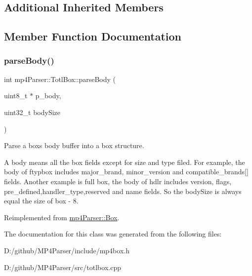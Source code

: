 \subsection*{Additional Inherited Members}


\subsection{Member Function Documentation}
\mbox{\label{classmp4_parser_1_1_totl_box_a352271d47a04f7884e81978ce4e8d697}} 
\subsubsection{\texorpdfstring{parseBody()}{parseBody()}}
{\footnotesize\ttfamily int mp4\+Parser\+::\+Totl\+Box\+::parse\+Body (\begin{DoxyParamCaption}\item[{uint8\+\_\+t $\ast$}]{p\+\_\+body,  }\item[{uint32\+\_\+t}]{body\+Size }\end{DoxyParamCaption})\hspace{0.3cm}{\ttfamily [virtual]}}



Parse a box\textquotesingle{}s body buffer into a box structure. 

A body means all the box fields except for size and type filed. For example, the body of ftypbox includes major\+\_\+brand, minor\+\_\+version and compatible\+\_\+brands\mbox{[}\mbox{]} fields. Another example is full box, the body of hdlr includes version, flags, pre\+\_\+defined,handler\+\_\+type,reserved and name fields. So the body\+Size is always equal the size of box -\/ 8. 

Reimplemented from \mbox{\hyperlink{classmp4_parser_1_1_box_a3dd0c084ac65bc77b69ac5ecaf796cb2}{mp4\+Parser\+::\+Box}}.



The documentation for this class was generated from the following files\+:\begin{DoxyCompactItemize}
\item 
D\+:/github/\+M\+P4\+Parser/include/mp4box.\+h\item 
D\+:/github/\+M\+P4\+Parser/src/totlbox.\+cpp\end{DoxyCompactItemize}
